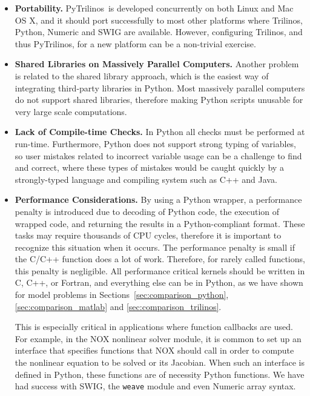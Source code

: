 \documentclass[acmtocl]{acmtrans2m}
\newcommand{\PyTrilinos}{{PyTrilinos}}
\begin{document}
\begin{itemize}

\item {\bf Portability.} \PyTrilinos\ is developed concurrently on
  both Linux and Mac OS X, and it should port successfully to most
  other platforms where Trilinos, Python, Numeric and SWIG are
  available. However, configuring Trilinos, and thus \PyTrilinos, for
  a new platform can be a non-trivial exercise.

\item {\bf Shared Libraries on Massively Parallel Computers.} Another
  problem is related to the shared library approach, which is the
  easiest way of integrating third-party libraries in Python. Most
  massively parallel computers do not support shared libraries,
  therefore making Python scripts unusable for very large scale
  computations.

\item {\bf Lack of Compile-time Checks.} In Python all checks must be
  performed at run-time.  Furthermore, Python does not support strong
  typing of variables, so user mistakes related to incorrect variable
  usage can be a challenge to find and correct, where these types of
  mistakes would be caught quickly by a strongly-typed language and
  compiling system such as C++ and Java.

\item {\bf Performance Considerations.}  By using a Python wrapper, a
  performance penalty is introduced due to decoding of Python code,
  the execution of wrapped code, and returning the results in a
  Python-compliant format. These tasks may require thousands of CPU
  cycles, therefore it is important to recognize this situation when
  it occurs.  The performance penalty is small if the C/C++ function
  does a lot of work.  Therefore, for rarely called functions, this
  penalty is negligible.  All performance critical kernels should be
  written in C, C++, or Fortran, and everything else can be in Python,
  as we have shown for model problems in
  Sections~\ref{sec:comparison_python}, \ref{sec:comparison_matlab}
  and \ref{sec:comparison_trilinos}.

  This is especially critical in applications where function callbacks
  are used.  For example, in the NOX nonlinear solver module, it is
  common to set up an interface that specifies functions that NOX
  should call in order to compute the nonlinear equation to be solved
  or its Jacobian.  When such an interface is defined in Python, these
  functions are of necessity Python functions.  We have had success
  with SWIG, the {\tt weave} module and even Numeric array syntax.


\end{itemize}
\end{document}
